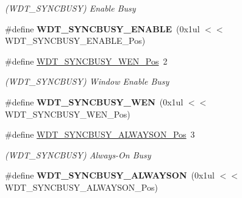 \begin{DoxyCompactItemize}
\begin{DoxyCompactList}\small\item\em (W\+D\+T\+\_\+\+S\+Y\+N\+C\+B\+U\+S\+Y) Enable Busy \end{DoxyCompactList}\item 
\hypertarget{group___s_a_m_l21___w_d_t_gacbd9cc0cc22056e9fcfabfc79beb1fcf}{}\#define {\bfseries W\+D\+T\+\_\+\+S\+Y\+N\+C\+B\+U\+S\+Y\+\_\+\+E\+N\+A\+B\+L\+E}~(0x1ul $<$$<$ W\+D\+T\+\_\+\+S\+Y\+N\+C\+B\+U\+S\+Y\+\_\+\+E\+N\+A\+B\+L\+E\+\_\+\+Pos)\label{group___s_a_m_l21___w_d_t_gacbd9cc0cc22056e9fcfabfc79beb1fcf}

\item 
\hypertarget{group___s_a_m_l21___w_d_t_ga2ded1ef3f13790d024811b1764038d6e}{}\#define \hyperlink{group___s_a_m_l21___w_d_t_ga2ded1ef3f13790d024811b1764038d6e}{W\+D\+T\+\_\+\+S\+Y\+N\+C\+B\+U\+S\+Y\+\_\+\+W\+E\+N\+\_\+\+Pos}~2\label{group___s_a_m_l21___w_d_t_ga2ded1ef3f13790d024811b1764038d6e}

\begin{DoxyCompactList}\small\item\em (W\+D\+T\+\_\+\+S\+Y\+N\+C\+B\+U\+S\+Y) Window Enable Busy \end{DoxyCompactList}\item 
\hypertarget{group___s_a_m_l21___w_d_t_ga917180f0148ac5507dd9801842eade04}{}\#define {\bfseries W\+D\+T\+\_\+\+S\+Y\+N\+C\+B\+U\+S\+Y\+\_\+\+W\+E\+N}~(0x1ul $<$$<$ W\+D\+T\+\_\+\+S\+Y\+N\+C\+B\+U\+S\+Y\+\_\+\+W\+E\+N\+\_\+\+Pos)\label{group___s_a_m_l21___w_d_t_ga917180f0148ac5507dd9801842eade04}

\item 
\hypertarget{group___s_a_m_l21___w_d_t_ga963f6e267713299cc68adf831b29abba}{}\#define \hyperlink{group___s_a_m_l21___w_d_t_ga963f6e267713299cc68adf831b29abba}{W\+D\+T\+\_\+\+S\+Y\+N\+C\+B\+U\+S\+Y\+\_\+\+A\+L\+W\+A\+Y\+S\+O\+N\+\_\+\+Pos}~3\label{group___s_a_m_l21___w_d_t_ga963f6e267713299cc68adf831b29abba}

\begin{DoxyCompactList}\small\item\em (W\+D\+T\+\_\+\+S\+Y\+N\+C\+B\+U\+S\+Y) Always-\/\+On Busy \end{DoxyCompactList}\item 
\hypertarget{group___s_a_m_l21___w_d_t_gadda06dbaa7c5f455dbf415865afe0291}{}\#define {\bfseries W\+D\+T\+\_\+\+S\+Y\+N\+C\+B\+U\+S\+Y\+\_\+\+A\+L\+W\+A\+Y\+S\+O\+N}~(0x1ul $<$$<$ W\+D\+T\+\_\+\+S\+Y\+N\+C\+B\+U\+S\+Y\+\_\+\+A\+L\+W\+A\+Y\+S\+O\+N\+\_\+\+Pos)\label{group___s_a_m_l21___w_d_t_gadda06dbaa7c5f455dbf415865afe0291}


\end{DoxyCompactItemize}
